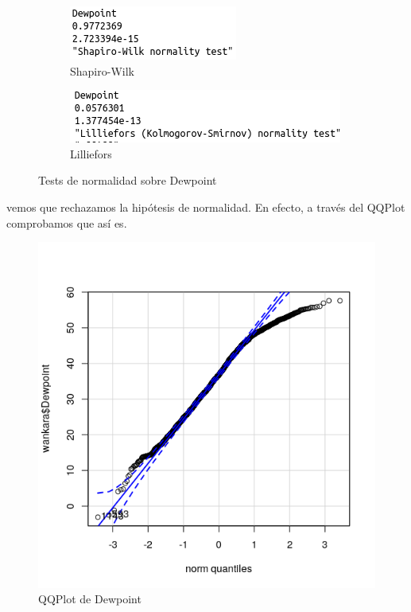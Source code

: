 \begin{figure}[H]
	\centering
	\begin{subfigure}{.5\textwidth}
		\centering
		\includegraphics[width=.7\linewidth]{shapiro-dew.png}
		\caption{Shapiro-Wilk}
		\label{fig:sw-dew}
	\end{subfigure}%
	\begin{subfigure}{.5\textwidth}
		\centering
		\includegraphics[width=.7\linewidth]{lillie-dew.png}	\caption{Lilliefors}
		\label{fig:l-dew}
	\end{subfigure}
	\caption{Tests de normalidad sobre Dewpoint}
	\label{fig:norm-dew}
\end{figure}

vemos que rechazamos la hipótesis de normalidad. En efecto, a través del QQPlot comprobamos que así es.


\begin{figure}[H] %
	\centering
	\includegraphics[scale=0.7]{qq-dew.png}  %
	\caption{QQPlot de Dewpoint} 
	\label{fig:qq-dew}
\end{figure}


